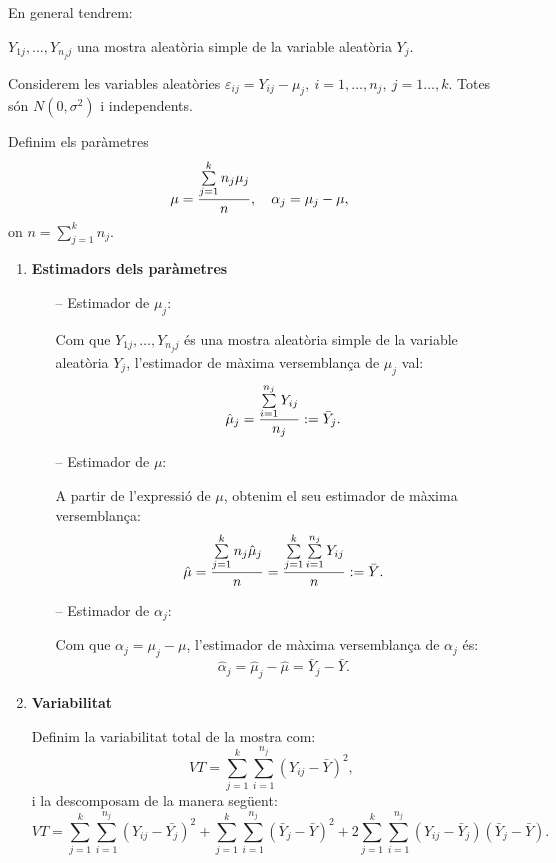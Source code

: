 En general tendrem:

$Y_{1j}, \ldots , Y_{n_j j}$ una mostra aleat\`oria simple de la variable
aleat\`oria $Y_j$.

Considerem les variables aleat\`ories $\varepsilon_{ij} = Y_{ij} - \mu_j, \ i = 1,
\ldots , n_j, \ j = 1 \ldots , k$. Totes s\'on $N(0,\sigma^2)$ i
independents.

Definim els par\`ametres
$$\mu = {\sum\limits_{j=1}^k n_j \mu_j \over n}, \quad \alpha_j = \mu_j - \mu,$$
on $n=\sum\limits_{j=1}^k n_j$.

\begin{enumerate}
\item {\bf Estimadors dels par\`ametres}
\begin{itemize}
\item[--] Estimador de $\mu_j$:

Com que $Y_{1j}, \ldots , Y_{n_j j}$ \'es una mostra aleat\`oria simple de la variable
aleat\`oria $Y_j$, l'estimador de m\`axima versemblan\c ca de $\mu_j$ val:
$$ \hat{\mu}_j = {\sum\limits_{i=1}^{n_j} Y_{ij} \over n_j} := \bar{Y}_j.$$

\item[--] Estimador de $\mu$:

A partir de l'expressi\'o de $\mu$, obtenim el seu estimador de m\`axima
versemblan\c{c}a:
$$ \hat{\mu} = {\sum\limits_{j=1}^k n_j \hat{\mu}_j \over n} =
{\sum\limits_{j=1}^k \sum\limits_{i=1}^{n_j} Y_{ij}\over n} := \bar{Y}.$$

\item[--] Estimador de $\alpha_j$:

Com que $\alpha_j = \mu_j - \mu$, l'estimador de m\`axima versemblan\c ca de
$\alpha_j$ \'es:
$$\hat{\alpha}_j = \hat{\mu}_j - \hat{\mu} = \bar{Y}_j - \bar{Y}.$$
\end{itemize}

\newpage

\item {\bf Variabilitat}

Definim la variabilitat total de la mostra com:
$$VT = \sum\limits_{j=1}^k \sum\limits_{i=1}^{n_j} (Y_{ij} - \bar{Y})^2,$$
i la descomposam de la manera seg\"uent:
$$VT = \sum\limits_{j=1}^k \sum\limits_{i=1}^{n_j} (Y_{ij} - \bar{Y_j})^2 +
\sum\limits_{j=1}^k \sum\limits_{i=1}^{n_j} (\bar{Y}_j - \bar{Y})^2 + 2
\sum\limits_{j=1}^k \sum\limits_{i=1}^{n_j} (Y_{ij} - \bar{Y}_j)(\bar{Y}_j -
\bar{Y}).$$


\end{enumerate}
